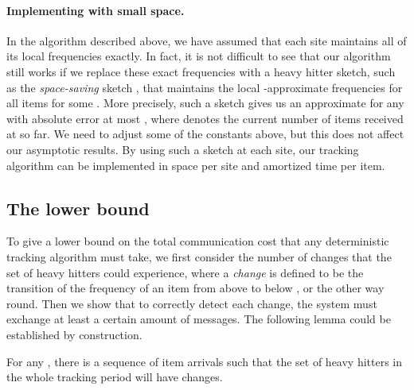 \documentclass[10pt]{article}
\begin{document}
\paragraph{Implementing with small space.}
In the algorithm described above, we have assumed that each site maintains
all of its local frequencies  exactly.  In fact, it is not
difficult to see that our algorithm still works if we replace these exact
frequencies with a heavy hitter sketch, such as the {\em space-saving}
sketch \cite{metwally06}, that maintains the local -approximate
frequencies for all items for some .  More precisely,
such a sketch gives us an approximate  for any  with
absolute error at most , where  denotes the current
number of items received at  so far.  We need to adjust some of the
constants above, but this does not affect our asymptotic results.  By using
such a sketch at each site, our tracking algorithm can be implemented in
 space per site and amortized  time per item.

\subsection{The lower bound} \label{sec:lower-bound-heavy-hitt}

To give a lower bound on the total communication cost that any
deterministic tracking algorithm must take, we first consider the number of
changes that the set of heavy hitters could experience, where a {\em
  change} is defined to be the transition of the frequency of an item from
above  to below , or the other way round.  Then we
show that to correctly detect each change, the system must exchange at
least a certain amount of messages. The following lemma could be
established by construction.

\begin{lemma}
\label{lem:numberOfOutputUpdates} For any , there is a
sequence of item arrivals such that the set of heavy hitters in
the whole tracking period will have 
changes.
\end{lemma}
\end{document}

